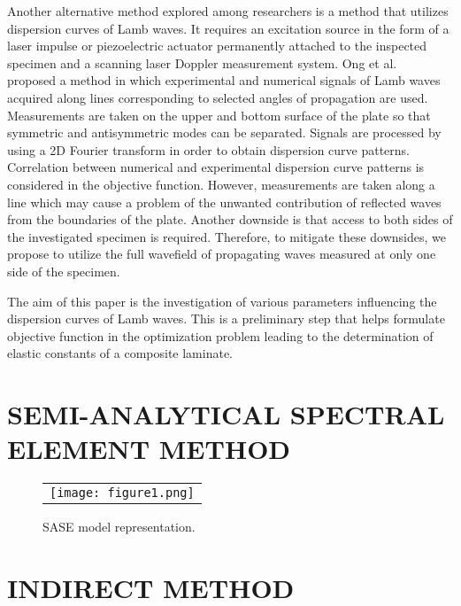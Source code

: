 \documentclass[]{spie}  %
\begin{document}
Another alternative method explored among researchers is a method that utilizes dispersion curves of Lamb waves.
It requires an excitation source in the form of a laser impulse or piezoelectric actuator permanently attached to the inspected specimen and a scanning laser Doppler measurement system.
Ong et al.~ proposed a method in which experimental and numerical signals of Lamb waves acquired along lines corresponding to selected angles of propagation are used. 
Measurements are taken on the upper and bottom surface of the plate so that symmetric and antisymmetric modes can be separated.
Signals are processed by using a 2D Fourier transform in order to obtain dispersion curve patterns. 
Correlation between numerical and experimental dispersion curve patterns is considered in the objective function.
However, measurements are taken along a line which may cause a problem of the unwanted contribution of reflected waves from the boundaries of the plate.
Another downside is that access to both sides of the investigated specimen is required.
Therefore, to mitigate these downsides, we propose to utilize the full wavefield of propagating waves measured at only one side of the specimen.

The aim of this paper is the investigation of various parameters influencing the dispersion curves of Lamb waves.
This is a preliminary step that helps formulate objective function in the optimization problem leading to the determination of elastic constants of a composite laminate.


\section{SEMI-ANALYTICAL SPECTRAL ELEMENT METHOD}
\label{sec:sase}


\begin{figure} [ht]
	\begin{center}
		\begin{tabular}{c} %
			\texttt{[image: figure1.png]}
		\end{tabular}
	\end{center}
	\caption[] 
	{ \label{fig:sase} 
		SASE model representation.}
\end{figure} 

\section{INDIRECT METHOD}
\label{sec:indirect}
\end{document}
